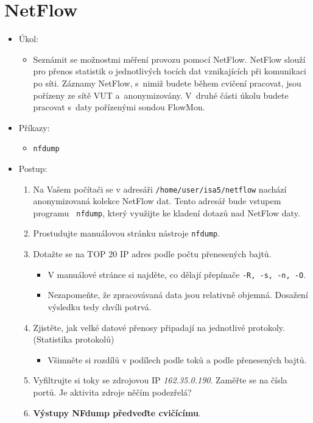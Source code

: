 \section{NetFlow}
\begin{itemize}
	\item Úkol:
	\begin{itemize}
		\item Seznámit se možnostmi měření provozu pomocí NetFlow. NetFlow slouží pro
		přenos statistik o jednotlivých tocích dat vznikajících při komunikaci po síti.
		Záznamy NetFlow, s~nimiž budete během cvičení pracovat, jsou
		pořízeny ze sítě VUT a~anonymizovány. V~druhé části úkolu
		budete pracovat s~daty pořízenými sondou FlowMon.
	\end{itemize}
	\item Příkazy:
	\begin{itemize}
		\item {\tt nfdump}
	\end{itemize}
	\item Postup:
	\begin{enumerate}
		\item Na Vašem počítači se v adresáři {\tt /home/user/isa5/netflow} nachází
		anonymizovaná kolekce NetFlow dat. Tento adresář bude vstupem programu
		{\tt
nfdump}, který využijte ke kladení dotazů nad NetFlow daty.
		\item Prostudujte manuálovou stránku nástroje {\tt nfdump}.
		\item Dotažte se na TOP 20 IP adres podle počtu přenesených bajtů. 
		\begin{itemize}
			\item V manuálové stránce si najděte, co dělají přepínače {\tt -R, -s, -n, -O}.
			\item Nezapomeňte, že zpracovávaná data jsou relativně objemná. Dosažení výsledku tedy chvíli potrvá.
		\end{itemize}
		\item Zjistěte, jak velké datové přenosy připadají na jednotlivé protokoly. (Statistika protokolů)
		\begin{itemize}
			\item Všimněte si rozdílů v podílech podle toků a podle přenesených bajtů.
		\end{itemize}
		\item Vyfiltrujte si toky se zdrojovou IP {\em 162.35.0.190}. Zaměřte se na čísla portů.
		Je aktivita zdroje něčím podezřelá?
		
		\item {\bf Výstupy NFdump předveďte cvičícímu}.
	\end{enumerate}
\end{itemize}

